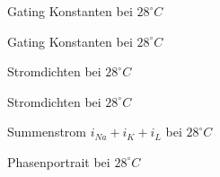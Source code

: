 \documentclass[conference]{IEEEtran}
\begin{document}
\begin{figure}[h!]
  	\centering
    \scalebox{.6}{}
    \caption{Gating Konstanten bei $28^\circ C$}
    \label{fig:Gating28}
\end{figure}

\begin{figure}[h!]
  	\centering
    \scalebox{.6}{}
    \caption{Gating Konstanten bei $28^\circ C$}
    \label{fig:GatingClose28}
\end{figure}

\begin{figure}[h!]
  	\centering
    \scalebox{.6}{}
    \caption{Stromdichten bei $28^\circ C$}
    \label{fig:Stromdichten28}
\end{figure}

\begin{figure}[h!]
  	\centering
    \scalebox{.6}{}
    \caption{Stromdichten bei $28^\circ C$}
    \label{fig:StromdichtenClose28}
\end{figure}

\begin{figure}[h!]
  	\centering
    \scalebox{.6}{}
    \caption{Summenstrom $i_{Na}+i_K+i_L$ bei $28^\circ C$}
    \label{fig:Summenstrom28}
\end{figure}

\begin{figure}[h!]
  	\centering
    \scalebox{.6}{}
    \caption{Phasenportrait bei $28^\circ C$}
    \label{fig:Phasenportrait28}
\end{figure}
\end{document}
